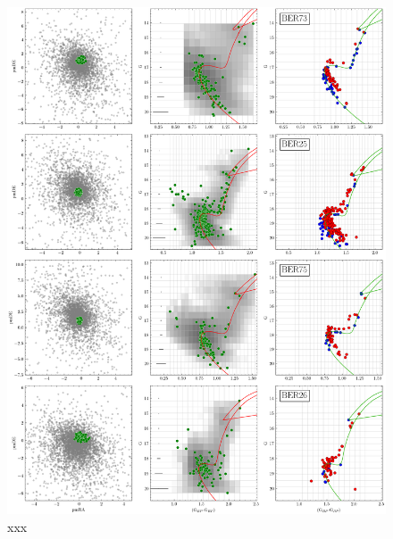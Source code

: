 \documentclass{aa}
\begin{document}
\begin{appendix}
 \begin{figure}
  \centering
  \includegraphics[height=.95\textheight]{figs/0_fpars.png}
  \caption{xxx}
  \label{fig:8fpars}
 \end{figure}


\end{appendix}
\end{document}
